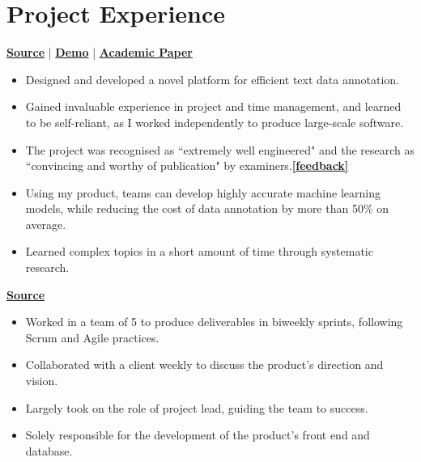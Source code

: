 \documentclass[]{resume}
\begin{document}
\begin{minipage}[t]{0.64\textwidth}
\section{Project Experience}
\vspace{\topsep}
\begin{flatitems}
\item[] \hfill \href{https://github.com/Claydelas/active-learning}{\bf Source} | \href{https://www.youtube.com/watch?v=56p8aQSYVqo}{\bf Demo} | \href{https://github.com/Claydelas/active-learning/blob/master/Report.pdf}{\bf Academic Paper}
    \begin{itemize}[leftmargin=*]
        \item Designed and developed a novel platform for efficient text data annotation.
        \item Gained invaluable experience in project and time management, and learned to be self-reliant, as I worked independently to produce large-scale software.
        \item The project was recognised as ``extremely well engineered" and the research as ``convincing and worthy of publication" by examiners.\hfill \href{https://github.com/Claydelas/active-learning/blob/master/feedback/Examiner\%202\%20Project\%20Assessment\%20Form\%20by\%20dem\%20(DE\%20Millard).pdf}{\bf [feedback]}
        \item Using my product, teams can develop highly accurate machine learning models, while reducing the cost of data annotation by more than 50\% on average.
        \item Learned complex topics in a short amount of time through systematic research.
    \end{itemize}
\item[] \hfill \href{https://github.com/Claydelas/dashboard-fx}{\bf Source}
    \begin{itemize}[leftmargin=*]
        \item Worked in a team of 5 to produce deliverables in biweekly sprints, following Scrum and Agile practices.
        \item Collaborated with a client weekly to discuss the product's direction and vision.
        \item Largely took on the role of project lead, guiding the team to success.
        \item Solely responsible for the development of the product's front end and database.

\end{itemize}
\end{flatitems}
\end{minipage}
\end{document}
